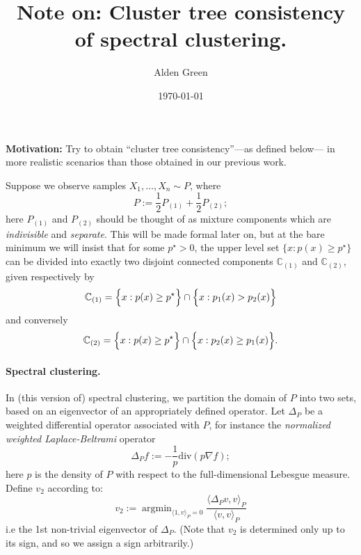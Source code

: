 \documentclass{article}
\newcommand{\1}{\mathbf{1}}
\DeclareMathOperator*{\argmin}{argmin}
\newcommand{\mb}[1]{\mathbb{#1}}
\theoremstyle{alden}
\theoremstyle{aldenthm}
\theoremstyle{definition}
\theoremstyle{remark}
\begin{document}
\title{Note on: Cluster tree consistency of spectral clustering.}
\author{Alden Green}
\date{\today}
\maketitle

\textbf{Motivation:} Try to obtain ``cluster tree consistency''---as defined below--- in more realistic scenarios than those obtained in our previous work.

Suppose we observe samples $X_1,\ldots,X_n \sim P$, where
\begin{equation*}
P  := \frac{1}{2}P_{(1)} + \frac{1}{2}P_{(2)};
\end{equation*}
here $P_{(1)}$ and $P_{(2)}$ should be thought of as mixture components which are \emph{indivisible} and \emph{separate}. This will be made formal later on, but at the bare minimum we will insist that for some $p^{\star} > 0$, the upper level set $\{x:p(x) \geq p^{\star}\}$ can be divided into exactly two disjoint connected components $\mb{C}_{(1)}$ and $\mb{C}_{(2)}$, given respectively by
\begin{equation*}
\mb{C}_{(1)} = \Bigl\{x:p(x) \geq p^{\star}\Bigr\} \cap \Bigl\{x: p_1(x) > p_2(x)\Bigr\}
\end{equation*}
and conversely
\begin{equation*}
\mb{C}_{(2)} = \Bigl\{x:p(x) \geq p^{\star}\Bigr\} \cap \Bigl\{x: p_2(x) \geq p_1(x)\Bigr\}.
\end{equation*}

\paragraph{Spectral clustering.}
In (this version of) spectral clustering, we partition the domain of $P$ into two sets, based on an eigenvector of an appropriately defined operator. Let $\Delta_P$ be a weighted differential operator associated with $P$, for instance the \emph{normalized weighted Laplace-Beltrami} operator
\begin{equation}
\label{eqn:normalized_laplace}
\Delta_Pf := -\frac{1}{p} \mathrm{div}(p \nabla f);
\end{equation}
here $p$ is the density of $P$ with respect to the full-dimensional Lebesgue measure. Define $v_2$ according to:
\begin{equation*}
v_2 := \argmin_{\langle 1,v \rangle_{P} = 0} \frac{\langle \Delta_P v, v \rangle_{P}}{\langle v,v \rangle_{P}}
\end{equation*}
i.e the 1st non-trivial eigenvector of $\Delta_P$. (Note that $v_2$ is determined only up to its sign, and so we assign a sign arbitrarily.) 
\end{document}
